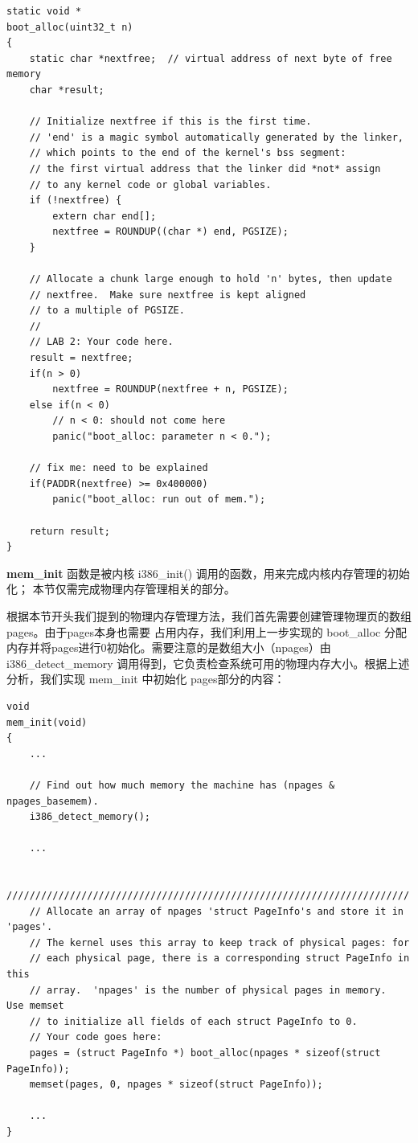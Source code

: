 \documentclass[12pt, letterpaper]{report}
\begin{document}
\lstset{style=CStyle}
\setmainfont{Consolas}
\begin{lstlisting}
static void *
boot_alloc(uint32_t n)
{
    static char *nextfree;	// virtual address of next byte of free memory
    char *result;

    // Initialize nextfree if this is the first time.
    // 'end' is a magic symbol automatically generated by the linker,
    // which points to the end of the kernel's bss segment:
    // the first virtual address that the linker did *not* assign
    // to any kernel code or global variables.
    if (!nextfree) {
        extern char end[];
        nextfree = ROUNDUP((char *) end, PGSIZE);
    }

    // Allocate a chunk large enough to hold 'n' bytes, then update
    // nextfree.  Make sure nextfree is kept aligned
    // to a multiple of PGSIZE.
    //
    // LAB 2: Your code here.
    result = nextfree;
    if(n > 0)
        nextfree = ROUNDUP(nextfree + n, PGSIZE);
    else if(n < 0)
        // n < 0: should not come here
        panic("boot_alloc: parameter n < 0.");
    
    // fix me: need to be explained
    if(PADDR(nextfree) >= 0x400000)
        panic("boot_alloc: run out of mem.");

    return result;
}
\end{lstlisting}
\setmainfont{Times New Roman}
\quad \par

\textbf{mem\_init} 函数是被内核 i386\_init() 调用的函数，用来完成内核内存管理的初始化；
本节仅需完成物理内存管理相关的部分。\par 
根据本节开头我们提到的物理内存管理方法，我们首先需要创建管理物理页的数组pages。由于pages本身也需要
占用内存，我们利用上一步实现的 boot\_alloc 分配内存并将pages进行0初始化。需要注意的是数组大小（npages）由 
i386\_detect\_memory 调用得到，它负责检查系统可用的物理内存大小。根据上述分析，我们实现 mem\_init 中初始化
pages部分的内容：\par 
\newpage
\lstset{style=CStyle}
\setmainfont{Consolas}
\begin{lstlisting}
void
mem_init(void)
{
    ...

    // Find out how much memory the machine has (npages & npages_basemem).
    i386_detect_memory();

    ...

    //////////////////////////////////////////////////////////////////////
    // Allocate an array of npages 'struct PageInfo's and store it in 'pages'.
    // The kernel uses this array to keep track of physical pages: for
    // each physical page, there is a corresponding struct PageInfo in this
    // array.  'npages' is the number of physical pages in memory.  Use memset
    // to initialize all fields of each struct PageInfo to 0.
    // Your code goes here:
    pages = (struct PageInfo *) boot_alloc(npages * sizeof(struct PageInfo));
    memset(pages, 0, npages * sizeof(struct PageInfo));

    ...
}
\end{lstlisting}
\setmainfont{Times New Roman}
\quad \par
\end{document}

